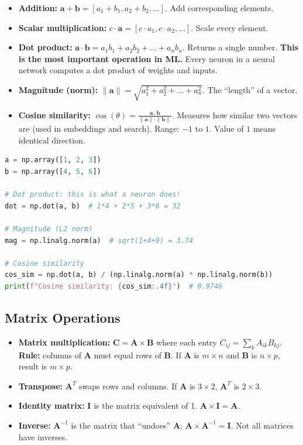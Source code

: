 \documentclass[12pt, a4paper, oneside]{book}
\begin{document}
\begin{itemize}[leftmargin=2em]
    \item \textbf{Addition:} $\mathbf{a} + \mathbf{b} = [a_1 + b_1, a_2 + b_2, \ldots]$. Add corresponding elements.
    \item \textbf{Scalar multiplication:} $c \cdot \mathbf{a} = [c \cdot a_1, c \cdot a_2, \ldots]$. Scale every element.
    \item \textbf{Dot product:} $\mathbf{a} \cdot \mathbf{b} = a_1 b_1 + a_2 b_2 + \ldots + a_n b_n$. Returns a single number. \textbf{This is the most important operation in ML.} Every neuron in a neural network computes a dot product of weights and inputs.
    \item \textbf{Magnitude (norm):} $\|\mathbf{a}\| = \sqrt{a_1^2 + a_2^2 + \ldots + a_n^2}$. The ``length'' of a vector.
    \item \textbf{Cosine similarity:} $\cos(\theta) = \frac{\mathbf{a} \cdot \mathbf{b}}{\|\mathbf{a}\| \cdot \|\mathbf{b}\|}$. Measures how similar two vectors are (used in embeddings and search). Range: $-1$ to $1$. Value of $1$ means identical direction.
\end{itemize}

\begin{lstlisting}[language=Python, caption={Vector operations}]
a = np.array([1, 2, 3])
b = np.array([4, 5, 6])

# Dot product: this is what a neuron does!
dot = np.dot(a, b)  # 1*4 + 2*5 + 3*6 = 32

# Magnitude (L2 norm)
mag = np.linalg.norm(a)  # sqrt(1+4+9) = 3.74

# Cosine similarity
cos_sim = np.dot(a, b) / (np.linalg.norm(a) * np.linalg.norm(b))
print(f"Cosine similarity: {cos_sim:.4f}")  # 0.9746
\end{lstlisting}

\subsection{Matrix Operations}

\begin{itemize}[leftmargin=2em]
    \item \textbf{Matrix multiplication:} $\mathbf{C} = \mathbf{A} \times \mathbf{B}$ where each entry $C_{ij} = \sum_k A_{ik} B_{kj}$. \textbf{Rule:} columns of $\mathbf{A}$ must equal rows of $\mathbf{B}$. If $\mathbf{A}$ is $m \times n$ and $\mathbf{B}$ is $n \times p$, result is $m \times p$.
    \item \textbf{Transpose:} $\mathbf{A}^T$ swaps rows and columns. If $\mathbf{A}$ is $3 \times 2$, $\mathbf{A}^T$ is $2 \times 3$.
    \item \textbf{Identity matrix:} $\mathbf{I}$ is the matrix equivalent of 1. $\mathbf{A} \times \mathbf{I} = \mathbf{A}$.
    \item \textbf{Inverse:} $\mathbf{A}^{-1}$ is the matrix that ``undoes'' $\mathbf{A}$: $\mathbf{A} \times \mathbf{A}^{-1} = \mathbf{I}$. Not all matrices have inverses.
\end{itemize}
\end{document}

